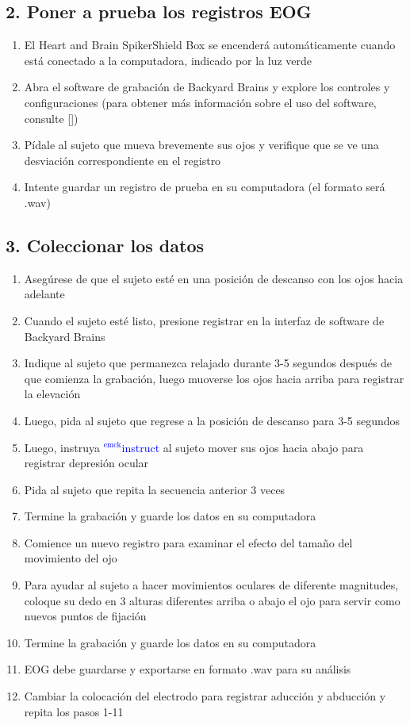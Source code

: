\documentclass[12pt]{article}
\newcommand{\emck}[1]{\textcolor{blue}{$^{\textrm{emck}}${#1}}}
\begin{document}
\subsection*{2. Poner a prueba los registros EOG}

\begin{enumerate}
\item El Heart and Brain SpikerShield Box se encenderá automáticamente
  cuando está conectado a la computadora, indicado por la luz verde
\item Abra el software de grabación de Backyard Brains y explore los
  controles y configuraciones (para obtener más información sobre el
  uso del software, consulte [\cite{spikeRecorder}])
\item Pídale al sujeto que mueva brevemente sus ojos y verifique que
 se ve una desviación correspondiente en el registro
\item Intente guardar un registro de prueba en su computadora (el
  formato será .wav)
\end{enumerate}

\subsection*{3. Coleccionar los datos}

\begin{enumerate}
\item Asegúrese de que el sujeto esté en una posición de descanso con
  los ojos hacia adelante
\item Cuando el sujeto esté listo, presione registrar en la interfaz
  de software de Backyard Brains
\item Indique al sujeto que permanezca relajado durante 3-5 segundos
  después de que comienza la grabación, luego muoverse los ojos hacia
  arriba para registrar la elevación
\item Luego, pida al sujeto que regrese a la posición de descanso para
  3-5 segundos
\item Luego, instruya \emck{instruct} al sujeto mover sus
  ojos hacia abajo para registrar depresión ocular
\item Pida al sujeto que repita la secuencia anterior 3 veces
\item Termine la grabación y guarde los datos en su computadora
\item Comience un nuevo registro para examinar el efecto del tamaño
  del movimiento del ojo
\item Para ayudar al sujeto a hacer movimientos oculares de diferente
  magnitudes, coloque su dedo en 3 alturas diferentes arriba o abajo
  el ojo para servir como nuevos puntos de fijación
\item Termine la grabación y guarde los datos en su computadora
\item EOG debe guardarse y exportarse en formato .wav para su análisis
\item Cambiar la colocación del electrodo para registrar aducción y
  abducción y repita los pasos 1-11
\end{enumerate}
\end{document}
